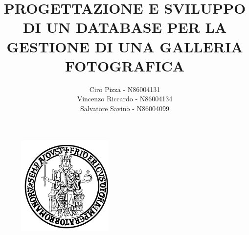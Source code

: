 \documentclass[a4paper]{article}
\begin{document}
\begin{figure}
	\begin{center}
    	\includegraphics[scale=0.6]{Immagini/FedericoII}
    \end{center}
\end{figure}

\title{PROGETTAZIONE E SVILUPPO DI UN DATABASE PER LA 
    	   GESTIONE DI UNA GALLERIA FOTOGRAFICA}
\author{Ciro Pizza - N86004131\\ Vincenzo Riccardo - N86004134\\ Salvatore Savino - N86004099}
\maketitle

\newpage
\tableofcontents
\newpage
\end{document}
